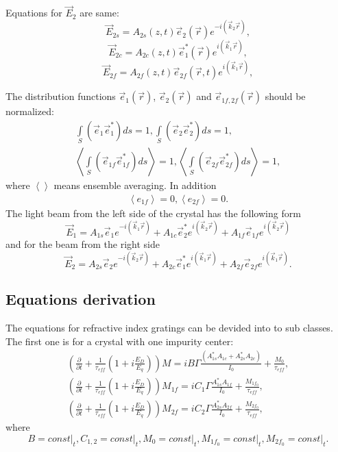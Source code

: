 Equations for $\vec{E}_2$ are same:
\[
\vec{E}_{2s}=A_{2s}(z,t)\vec{e}_2(\vec{r})e^{-i(\vec{k}_2\vec{r})},
\]
\[
\vec{E}_{2c}=A_{2c}(z,t)\vec{e}_1^\ast(\vec{r})e^{i(\vec{k}_1\vec{r})}, 
\]
\[
\vec{E}_{2f}=A_{2f}(z,t)\vec{e}_{2f}(\vec{r},t)e^{i(\vec{k}_1\vec{r})}, 
\]

The distribution functions $\vec{e}_1(\vec{r})$, $\vec{e}_2(\vec{r})$ and 
$\vec{e}_{1f,2f}(\vec{r})$ should be normalized:
\begin{eqnarray}
\int \limits_{S} \left( \vec{e}_1 \vec{e}_1^\ast \right) ds=1, 
\int \limits_{S} \left( \vec{e}_2 \vec{e}_2^\ast \right) ds=1,
\nonumber \\
\left\langle \int \limits_{S} \left(\vec{e}_{1f} 
\vec{e}_{1f}^{\ast} \right) ds \right\rangle = 1,
\left\langle \int \limits_{S} \left(\vec{e}_{2f} 
\vec{e}_{2f}^{\ast} \right) ds \right\rangle = 1,
\label{eqNorm_dpcm} 
\end{eqnarray}
where $\left\langle\right\rangle$ means ensemble averaging. In addition 
\begin{eqnarray} 
\left\langle e_{1f} \right\rangle = 0,
\left\langle e_{2f} \right\rangle = 0.
\label{eqZeroF_dpcm} 
\end{eqnarray}
The light beam from the left side of the crystal has the following form
\begin{equation} 
\vec{E}_1=A_{1s}\vec{e}_1 e^{-i(\vec{k}_1 \vec{r})} + 
A_{1c}\vec{e}_2^\ast e^{i(\vec{k}_2 \vec{r})} + 
A_{1f}\vec{e}_{1f} e^{i(\vec{k}_2 \vec{r})} 
\label{eqFieldLeft} 
\end{equation} 
and for the beam from the right side
\begin{equation} 
\vec{E}_2=A_{2s}\vec{e}_2 e^{-i(\vec{k}_2 \vec{r})} + 
A_{2c}\vec{e}_1^\ast e^{i(\vec{k}_1 \vec{r})} + 
A_{2f}\vec{e}_{2f} e^{i(\vec{k}_1 \vec{r})}. 
\label{eqFieldRight} 
\end{equation} 

\subsection{Equations derivation}

The equations for refractive index gratings can be devided into to sub
classes. The first one is for a crystal with one impurity center:
\begin{eqnarray}  
\left(\frac{\partial}{\partial{t}} 
+\frac{1}{\tau_{eff}}
\left(
1 + i \frac{E_D}{E_q}
\right)
\right){M} 
= 
i B \Gamma \frac{(A_{1s}^\ast A_{1c}+A_{2s}^\ast A_{2c})}{I_0}
+ \frac{M_0}{\tau_{eff}}
, \nonumber \\ 
\left(\frac{\partial}{\partial{t}}
+\frac{1}{\tau_{eff}}
\left(
1 + i \frac{E_D}{E_q}
\right)
\right){M_{1f}} = 
i C_1 \Gamma \frac{ A_{1s}^{\ast} A_{1f}}{I_0}
+ \frac{M_{1f_0}}{\tau_{eff}}
, \nonumber \\ 
\left(\frac{\partial}{\partial{t}} 
+\frac{1}{\tau_{eff}}
\left(
1 + i \frac{E_D}{E_q}
\right)
\right){M_{2f}} = 
i C_2 \Gamma  \frac{A_{2s}^{\ast} A_{2f}}{I_0}
+ \frac{M_{2f_0}}{\tau_{eff}}
, 
\label{eqGrating_1_dpcm} 
\end{eqnarray} 
where
\[
B = \left.const\right|_t,
C_{1,2} = \left.const\right|_t,
M_0 = \left.const\right|_t,
M_{1f_0} = \left.const\right|_t,
M_{2f_0} = \left.const\right|_t.
\] 

